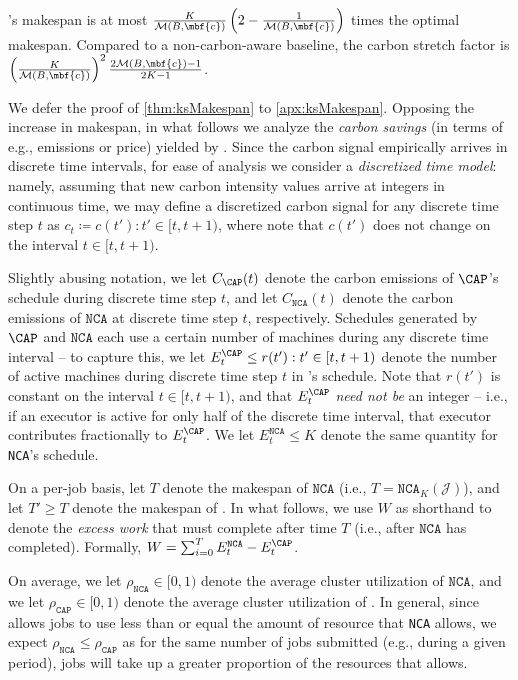 \begin{thm}\label{thm:ksMakespan}
    \CAP's makespan is at most $\frac{K}{\mathcal{M}(B, \mbf{c})} \left( 2 - \frac{1}{\mathcal{M}(B, \mbf{c})} \right)$ times the optimal makespan.  Compared to a non-carbon-aware baseline, the carbon stretch factor is $\left(\frac{K}{\mathcal{M}(B, \mbf{c})}\right)^2 \frac{2\mathcal{M}(B, \mbf{c})-1}{2K-1}$.
\end{thm}

We defer the proof of \autoref{thm:ksMakespan} to \autoref{apx:ksMakespan}.  Opposing the increase in makespan, in what follows we analyze the \textit{carbon savings} (in terms of e.g., emissions or price) yielded by \CAP.  Since the carbon signal empirically arrives in discrete time intervals, for ease of analysis we consider a \textit{discretized time model}: namely, assuming that new carbon intensity values arrive at integers in continuous time, we may define a discretized carbon signal for any discrete time step $t$ as $c_{t} \coloneqq c(t') : t' \in [t, t+1)$, where note that $c(t')$ does not change on the interval $t \in [t, t+1)$.

Slightly abusing notation, we let $C_{\CAP}(t)$ denote the carbon emissions of $\CAP$'s schedule during discrete time step $t$, and let $C_{\texttt{NCA}}(t)$ denote the carbon emissions of $\texttt{NCA}$ at discrete time step $t$, respectively.  
Schedules generated by $\CAP$ and $\texttt{NCA}$ each use a certain number of machines during any discrete time interval -- to capture this, we let $E^\CAP_t \leq r(t') : t' \in [t, t+1)$ denote the number of active machines during discrete time step $t$ in \CAP's schedule.  Note that  $r(t')$ is constant on the interval $t \in [t, t+1)$, and that $E^\CAP_t$ \textit{need not be} an integer -- i.e., if an executor is active for only half of the discrete time interval, that executor contributes fractionally to $E^\CAP_t$.  We let $E^\texttt{NCA}_t \leq K$ denote the same quantity for \texttt{NCA}'s schedule.

On a per-job basis, let $T$ denote the makespan of $\texttt{NCA}$ (i.e., $T = \texttt{NCA}_K(\mathcal{J})$), and let $T' \ge T$ denote the makespan of \CAP.  In what follows, we use $W$ as shorthand to denote the \textit{excess work} that \CAP must complete after time $T$ (i.e., after $\texttt{NCA}$ has completed).  Formally, $W = \sum_{i=0}^T E^\texttt{NCA}_t - E^\CAP_t$.

On average, we let $\rho_{\texttt{NCA}} \in [0,1)$ denote the average cluster utilization of $\texttt{NCA}$, and we let $\rho_{\texttt{CAP}} \in [0,1)$ denote the average cluster  utilization of \CAP.  In general, since \CAP allows jobs to use less than or equal the amount of resource that \texttt{NCA} allows, we expect $\rho_{\texttt{NCA}} \leq \rho_{\texttt{CAP}}$ as for the same number of jobs submitted (e.g., during a given period), jobs will take up a greater proportion of the resources that \CAP allows.

